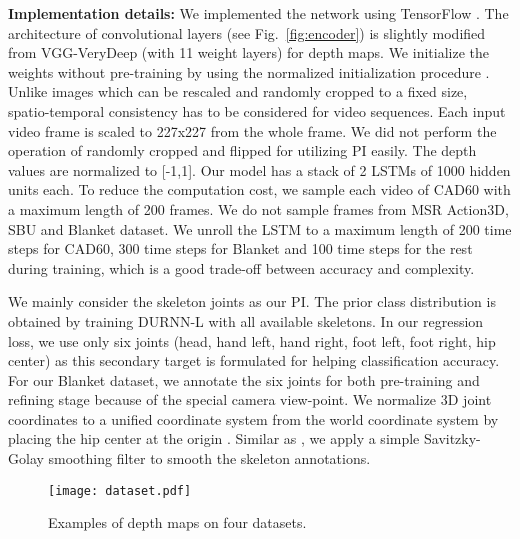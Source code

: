 \documentclass[10pt,twocolumn,letterpaper]{article}
\begin{document}
\noindent \textbf{Implementation details:} We implemented the network using TensorFlow \cite{tensorflow}. The architecture of convolutional layers (see Fig.~\ref{fig:encoder}) is slightly modified from VGG-VeryDeep \cite{Simonyan15c} (with 11 weight layers) for depth maps.  We initialize the weights without pre-training by using the normalized initialization procedure \cite{glorot2010understanding}. Unlike images which can be rescaled and randomly cropped to a fixed size, spatio-temporal consistency has to be considered for video sequences. Each input video frame is scaled to 227x227 from the whole frame. We did not perform the operation of randomly cropped and flipped for utilizing PI easily. The depth values are normalized to [-1,1]. Our model has a stack of 2 LSTMs of 1000 hidden units each. To reduce the computation cost, we sample each video of CAD60 with a maximum length of 200 frames. We do not sample frames from MSR Action3D, SBU and Blanket dataset. We unroll the LSTM to a maximum length of 200 time steps for CAD60, 300 time steps for Blanket and 100 time steps for the rest during training, which is a good trade-off between accuracy and complexity. 

We mainly consider the skeleton joints as our PI. The prior class distribution is obtained by training DURNN-L \cite{Yong_cvpr_2015} with all available skeletons. In our regression loss, we use only six joints (\ie head, hand left, hand right, foot left, foot right, hip center) as this secondary target is formulated for helping classification accuracy. For our Blanket dataset, we annotate the six joints for both pre-training and refining stage because of the special camera view-point. We normalize 3D joint coordinates to a unified coordinate system from the world coordinate system by placing the hip center at the origin \cite{Vemulapalli_cvpr_2014}. Similar as \cite{Yong_cvpr_2015},  we apply a simple Savitzky-Golay smoothing filter to smooth the skeleton annotations.  






\begin{figure}[t]
\centering
   \texttt{[image: dataset.pdf]}
 
\caption{Examples of depth maps on four datasets.} 
\label{fig:data}
\end{figure}
\end{document}
